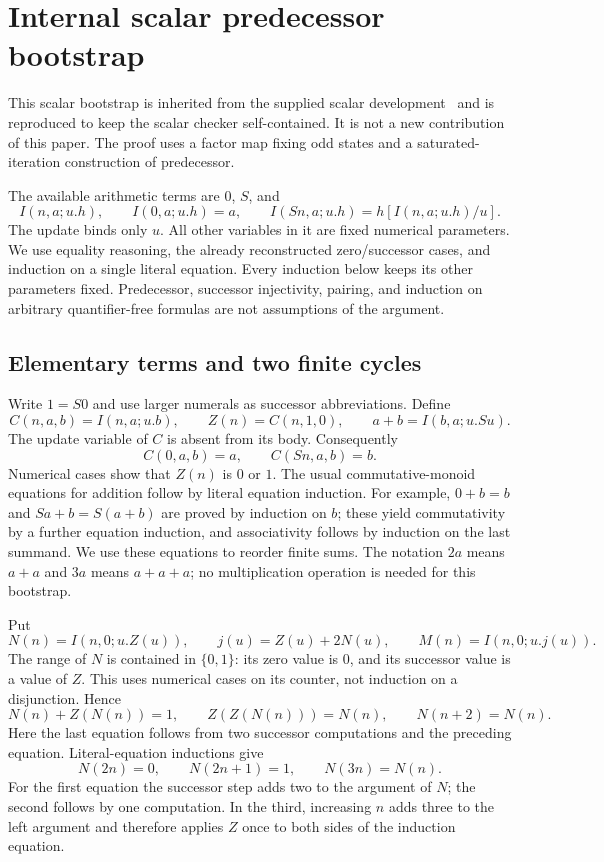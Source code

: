 \documentclass[11pt]{article}
\theoremstyle{definition}\newtheorem{definition}[theorem]{Definition}
\begin{document}
\section{Internal scalar predecessor bootstrap}
\label{sec:hybrid-bootstrap}

This scalar bootstrap is inherited from the supplied scalar development~\cite{erasure} and is reproduced to keep the scalar checker self-contained. It is not a new contribution of this paper. The proof uses a factor map fixing odd states and a saturated-iteration construction of predecessor.

The available arithmetic terms are $0$, $S$, and
\[
 I(n,a;u.h),\qquad
 I(0,a;u.h)=a,\qquad
 I(Sn,a;u.h)=h[I(n,a;u.h)/u].
\]
The update binds only $u$.  All other variables in it are fixed numerical
parameters.  We use equality reasoning, the already reconstructed
zero/successor cases, and induction on a single literal equation.
Every induction below keeps its other parameters fixed.  Predecessor,
successor injectivity, pairing, and induction on arbitrary
quantifier-free formulas are not assumptions of the argument.

\subsection{Elementary terms and two finite cycles}

Write $1=S0$ and use larger numerals as successor abbreviations.  Define
\[
 C(n,a,b)=I(n,a;u.b),\qquad
 Z(n)=C(n,1,0),\qquad
 a+b=I(b,a;u.Su).
\]
The update variable of $C$ is absent from its body.  Consequently
\[
 C(0,a,b)=a,\qquad C(Sn,a,b)=b.
\]
Numerical cases show that $Z(n)$ is $0$ or $1$.
The usual commutative-monoid equations for addition follow by literal
equation induction.  For example, $0+b=b$ and $Sa+b=S(a+b)$ are
proved by induction on $b$; these yield commutativity by a further
equation induction, and associativity follows by induction on the last
summand.  We use these equations to reorder finite sums.  The notation
$2a$ means $a+a$ and $3a$ means $a+a+a$; no multiplication operation
is needed for this bootstrap.

Put
\[
 N(n)=I(n,0;u.Z(u)),\qquad
 j(u)=Z(u)+2N(u),\qquad
 M(n)=I(n,0;u.j(u)).
\]
The range of $N$ is contained in $\{0,1\}$: its zero value is $0$,
and its successor value is a value of $Z$.  This uses numerical cases
on its counter, not induction on a disjunction.  Hence
\begin{equation}
 N(n)+Z(N(n))=1,\qquad
 Z(Z(N(n)))=N(n),\qquad N(n+2)=N(n).
 \label{eq:hybrid-parity}
\end{equation}
Here the last equation follows from two successor computations and
the preceding equation.  Literal-equation inductions give
\begin{equation}
 N(2n)=0,\qquad N(2n+1)=1,\qquad N(3n)=N(n).
 \label{eq:hybrid-parity-scaling}
\end{equation}
For the first equation the successor step adds two to the argument of
$N$; the second follows by one computation.  In the third, increasing
$n$ adds three to the left argument and therefore applies $Z$ once to
both sides of the induction equation.
\end{document}
